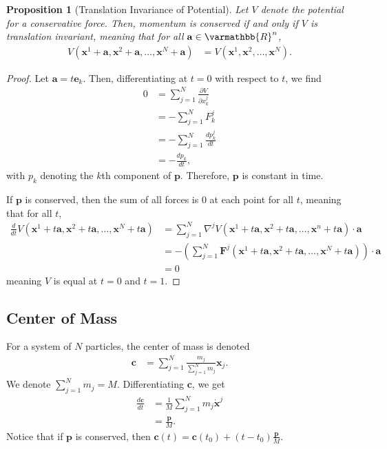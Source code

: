 \documentclass[12pt]{extarticle}
\newcommand{\R}{\varmathbb{R}}
\theoremstyle{plain}
\newtheorem*{proposition}{Proposition}%
\theoremstyle{definition}
\theoremstyle{remark}
\renewcommand{\newline}{\hfill\break}
\begin{document}
  \begin{proposition}[Translation Invariance of Potential]
  Let $V$ denote the potential for a conservative force. Then, momentum is conserved if and only if $V$ is translation invariant, meaning that for all $\mathbf{a}\in \R^n$,
  \begin{align*}
    V(\mathbf{x}^1 + \mathbf{a},\mathbf{x}^2 + \mathbf{a},\dots,\mathbf{x}^N+\mathbf{a}) &= V(\mathbf{x}^1,\mathbf{x}^2,\dots,\mathbf{x}^N).
  \end{align*}
  \end{proposition}
  \begin{proof}
  Let $\mathbf{a} = t\mathbf{e}_k$. Then, differentiating at $t=0$ with respect to $t$, we find
      \begin{align*}
        0 &= \sum_{j=1}^{N}\frac{\partial V}{\partial x_{k}^j}\\
          &= -\sum_{j=1}^{N}F^{j}_k\\
          &= -\sum_{j=1}^{N}\frac{dp_{k}^j}{dt}\\
          &= -\frac{dp_k}{dt},
      \end{align*}
      with $p_k$ denoting the $k$th component of $\mathbf{p}$. Therefore, $\mathbf{p}$ is constant in time.\newline

      If $\mathbf{p}$ is conserved, then the sum of all forces is $0$ at each point for all $t$, meaning that for all $t$,
      \begin{align*}
        \frac{d}{dt}V(\mathbf{x}^1 + t\mathbf{a} , \mathbf{x}^2 + t\mathbf{a},\dots,\mathbf{x}^N + t\mathbf{a}) &= \sum_{j=1}^{N}\nabla^jV(\mathbf{x}^1 + t\mathbf{a},\mathbf{x}^2 + t\mathbf{a},\dots,\mathbf{x}^n + t\mathbf{a})\cdot \mathbf{a}\\
                                                                                              &= -\left(\sum_{j=1}^{N}\mathbf{F}^j(\mathbf{x}^1 + t\mathbf{a}, \mathbf{x}^2 + t\mathbf{a},\dots,\mathbf{x}^N + t\mathbf{a})\right)\cdot \mathbf{a}\\
                                                                                              &= 0
      \end{align*}
      meaning $V$ is equal at $t=0$ and $t=1$.
  \end{proof}
  \subsection{Center of Mass}%
  For a system of $N$ particles, the center of mass is denoted
  \begin{align*}
    \mathbf{c} &= \sum_{j=1}^{N}\frac{m_j}{\sum_{j=1}^{N}m_j}\mathbf{x}_j.
  \end{align*}
  We denote $\sum_{j=1}^{N}m_j = M$. Differentiating $\mathbf{c}$, we get
  \begin{align*}
    \frac{d\mathbf{c}}{dt} &= \frac{1}{M}\sum_{j=1}^{N}m_j\mathbf{\dot{x}}^j\\
                        &= \frac{\mathbf{p}}{M}.
  \end{align*}
  Notice that if $ \mathbf{p} $ is conserved, then $ \mathbf{c}(t) = \mathbf{c}(t_0) + (t-t_0)\frac{ \mathbf{p} }{M}$.\newline
\end{document}
